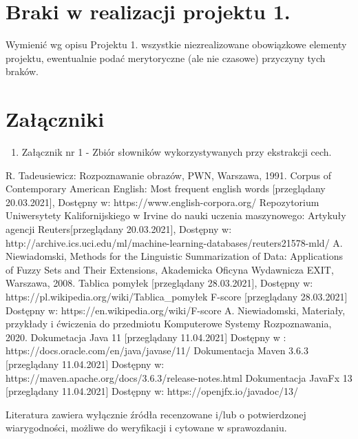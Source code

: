\documentclass{classrep}
\begin{document}


\section{Braki w realizacji projektu 1.}
Wymienić wg opisu Projektu 1. wszystkie niezrealizowane obowiązkowe elementy projektu, ewentualnie
podać merytoryczne (ale nie czasowe) przyczyny tych braków. 

\section*{Załączniki}
\begin{enumerate}
   \item Załącznik nr 1 - Zbiór słowników wykorzystywanych przy ekstrakcji cech.
\end{enumerate}

\begin{thebibliography}{0}
 R. Tadeusiewicz: Rozpoznawanie obrazów, PWN, Warszawa, 1991.  
 Corpus of Contemporary American English: Most frequent english words [przeglądany  20.03.2021], Dostępny w: https://www.english-corpora.org/
 Repozytorium Uniwersytety Kalifornijskiego w Irvine do nauki uczenia maszynowego: Artykuły agencji Reuters[przeglądany 20.03.2021], 
Dostępny w: http://archive.ics.uci.edu/ml/machine-learning-databases/reuters21578-mld/
 A. Niewiadomski, Methods for the Linguistic Summarization of Data: Applications of Fuzzy Sets and Their Extensions, Akademicka Oficyna Wydawnicza EXIT, Warszawa, 2008.
 Tablica pomyłek [przeglądany 28.03.2021], Dostępny w: https://pl.wikipedia.org/wiki/Tablica\_pomyłek
 F-score [przeglądany 28.03.2021] Dostępny w: https://en.wikipedia.org/wiki/F-score
 A. Niewiadomski, Materiały, przykłady i ćwiczenia do przedmiotu Komputerowe Systemy Rozpoznawania, 2020.
 Dokumetacja Java 11 [przeglądany 11.04.2021] Dostępny w : https://docs.oracle.com/en/java/javase/11/
 Dokumentacja Maven 3.6.3 [przeglądany 11.04.2021] Dostępny w: https://maven.apache.org/docs/3.6.3/release-notes.html
 Dokumentacja JavaFx 13 [przeglądany 11.04.2021] Dostępny w: https://openjfx.io/javadoc/13/ 
\end{thebibliography}

Literatura zawiera wyłącznie źródła recenzowane i/lub o potwierdzonej wiarygodności,
możliwe do weryfikacji i cytowane w sprawozdaniu. 
\end{document}

